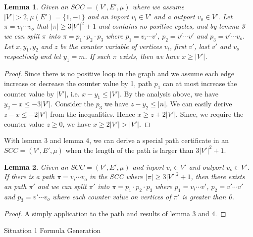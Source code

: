 \documentclass[12pt]{article}
\newtheorem{lemma}{Lemma}
\newtheorem{proof}{\textit{Proof}}
\begin{document}
\begin{itemize}
\begin{lemma}
Given an $SCC = (V', E', \mu)$ where we assume $|V'| > 2, \mu(E')= \{1,-1\}$ and an inport $v_i\in V'$ and a outport $v_o \in V'$. Let $\pi = v_i\cdots v_o$ that $|\pi| \ge 3|V'|^2 + 1$ and contains no positive cycles, and by lemma 3 we can split $\pi$ into $\pi = p_1\cdot p_2 \cdot p_3$ where $p_1 = v_i\cdots v'$, $p_2 = v'\cdots v'$ and $p_3 = v'\cdots v_o$. Let $x,y_1,y_2$ and $z$ be the counter variable of vertices $v_i$, first $v'$, last $v'$ and $v_o$ respectively and let $y_1 = m$. If such $\pi$ exists, then we have $x\ge |V'|$.



\end{lemma}


\begin{proof}
Since there is no positive loop in the graph and we assume each edge increase or decrease the counter value by 1, path $p_1$ can at most increase the counter value by $|V'|$, i.e. $x - y_1 \le |V'|$. By the analysis above, we have $y_2 - x \le -3|V'|$. Consider the $p_3$ we have $z - y_2 \le |n|$. We can easily derive $z - x \le -2|V'|$ from the inequalities. Hence $x \ge z + 2|V'|$. Since, we require the counter value $z\ge 0$, we have $x \ge 2|V'| > |V'|$.




\end{proof}

With lemma 3 and lemma 4, we can derive a special path certificate in an  $SCC = (V', E', \mu)$ when the length of the path is larger than $3|V'|^2 + 1$.

\begin{lemma}
Given an $SCC = (V', E', \mu)$ and inport $v_i\in V'$ and outport $v_o\in V'$. If there is a path $\pi = v_i\cdots v_o$ in the SCC where $|\pi| \ge 3|V'|^2 + 1$, then there exists an path $\pi'$ and we can split $\pi'$ into $\pi = p_1\cdot p_2 \cdot p_3$ where $p_1 = v_i\cdots v'$, $p_2 = v'\cdots v'$ and $p_3 = v'\cdots v_o$ where each counter value on vertices of $\pi'$ is greater than 0.


\end{lemma}


\begin{proof}
A simply application to the path and results of lemma 3 and 4.
\end{proof}

\begin{algorithm}

	\caption{Situation 1 Formula Generation}
	\begin{algorithmic}
		

\end{algorithmic}
\end{algorithm}
\end{itemize}
\end{document}
